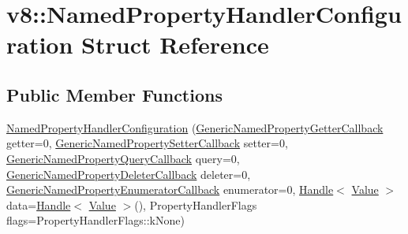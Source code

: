 \hypertarget{structv8_1_1_named_property_handler_configuration}{}\section{v8\+:\+:Named\+Property\+Handler\+Configuration Struct Reference}
\label{structv8_1_1_named_property_handler_configuration}
\subsection*{Public Member Functions}
\begin{DoxyCompactItemize}
\item 
\hyperlink{structv8_1_1_named_property_handler_configuration_a192a4ed58ec8d3398b8fe11a8894f9d4}{Named\+Property\+Handler\+Configuration} (\hyperlink{namespacev8_a24b1801fa53a7c5a71366d8044927563}{Generic\+Named\+Property\+Getter\+Callback} getter=0, \hyperlink{namespacev8_af74716c6e95a269c6cd4314662fd0a7e}{Generic\+Named\+Property\+Setter\+Callback} setter=0, \hyperlink{namespacev8_add9f7ab11e4a9a2b9ad2c4536b0e1a64}{Generic\+Named\+Property\+Query\+Callback} query=0, \hyperlink{namespacev8_ad2aecc0406ea4bc02d5a4f84a433b273}{Generic\+Named\+Property\+Deleter\+Callback} deleter=0, \hyperlink{namespacev8_a20826eb7e52e84fa4f632534e8eddd04}{Generic\+Named\+Property\+Enumerator\+Callback} enumerator=0, \hyperlink{classv8_1_1_local}{Handle}$<$ \hyperlink{classv8_1_1_value}{Value} $>$ data=\hyperlink{classv8_1_1_local}{Handle}$<$ \hyperlink{classv8_1_1_value}{Value} $>$(), Property\+Handler\+Flags flags=Property\+Handler\+Flags\+::k\+None)
\end{DoxyCompactItemize}
